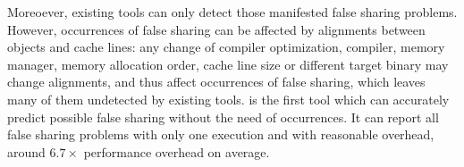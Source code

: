 Moreoever, existing tools can only detect those manifested false sharing problems.
However, occurrences of false sharing can be affected by alignments between
objects and cache lines: any change of compiler optimization, compiler, memory manager, 
memory allocation order, cache line size or different target binary 
may change alignments, and thus affect occurrences of false sharing, 
which leaves many of them undetected by existing tools.
\Predator{} is the first tool which can accurately predict possible false sharing 
without the need of occurrences. 
It can report all false sharing problems with only one execution and with reasonable overhead, 
around $6.7\times$ performance overhead on average.


